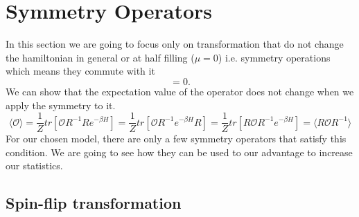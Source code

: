 \section{Symmetry Operators}
\label{sec:sym-oper}
In this section we are going to focus only on transformation that do not change the hamiltonian in general or at half filling ($\mu=0$) i.e. symmetry operations which means they commute with it 
\begin{equation}
  [H,R] = 0.
\end{equation}
We can show that the expectation value of the operator does not change when we apply the symmetry to it.
\begin{equation}
 \langle \mathcal{O} \rangle = \frac{1}{Z} tr[\mathcal{O}R^{-1}Re^{-\beta H}] = \frac{1}{Z} tr[\mathcal{O}R^{-1}e^{-\beta H}R] = \frac{1}{Z} tr[R\mathcal{O}R^{-1}e^{-\beta H}] = \langle R\mathcal{O}R^{-1} \rangle
\end{equation}
For our chosen model, there are only a few symmetry operators that satisfy this condition. We are going to see how they can be used to our advantage to increase our statistics.

\subsection{Spin-flip transformation}

